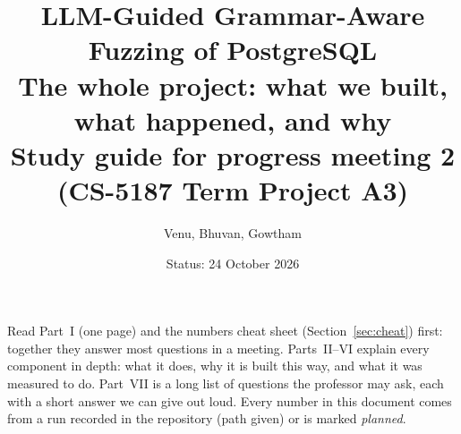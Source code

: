 \documentclass[11pt,a4paper]{article}
\title{\textbf{LLM-Guided Grammar-Aware Fuzzing of PostgreSQL}\\[4pt]
\large The whole project: what we built, what happened, and why\\[2pt]
\normalsize Study guide for progress meeting 2 (CS-5187 Term Project A3)}
\author{Venu, Bhuvan, Gowtham}
\date{Status: 24 October 2026}
\begin{document}
\maketitle
\thispagestyle{empty}

\begin{keybox}
Read Part~I (one page) and the numbers cheat sheet (Section~\ref{sec:cheat}) first:
together they answer most questions in a meeting. Parts~II--VI explain every
component in depth: what it does, why it is built this way, and what it was
measured to do. Part~VII is a long list of questions the professor may ask,
each with a short answer we can give out loud. Every number in this document
comes from a run recorded in the repository (path given) or is marked
\emph{planned}.
\end{keybox}

\tableofcontents
\clearpage













\end{document}
